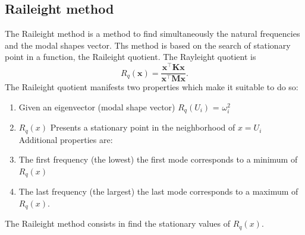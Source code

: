 \documentclass[twosided,a4paper]{article}           %
\newcommand{\tr}{^{{\bm \top}}}
\begin{document}
\subsection{Raileight method}
The Raileight method is a method to find simultaneously the natural frequencies and the modal shapes vector. Ths method is based on the search of stationary point in a function, the Raileight quotient.
The Rayleight quotient is 
	\begin{equation}
		R_q(\bm x) = \dfrac{\bm x\tr \bm K \bm x}{\bm x\tr \bm M \bm x} .
	\end{equation}
The Raileight quotient manifests two properties which make it suitable to do so:
\begin{enumerate}
	\item Given an eigenvector (modal shape vector) $R_q(U_i)$ = $\omega_i^2$
	\item $R_q(x)$ Presents a stationary point in the neighborhood of $x = U_i$\\

Additional properties are:

	\item The first frequency (the lowest) the first mode corresponds to a minimum of $R_q(x)$
	\item The last frequency (the largest) the last mode corresponds to a maximum of $R_q(x)$.
\end{enumerate}
The Raileight method consists in find the stationary values of $R_q(x)$.
\end{document}
